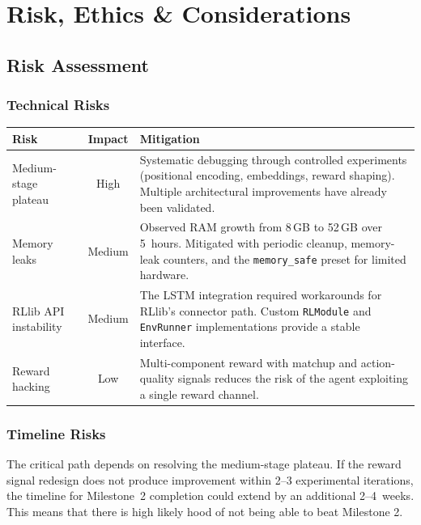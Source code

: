 \chapter{Risk, Ethics \& Considerations}
\label{ch:risk}

\section{Risk Assessment}

\subsection{Technical Risks}

\begin{center}
\small
\begin{tabularx}{\textwidth}{l c X}
  \toprule
  \textbf{Risk} & \textbf{Impact} & \textbf{Mitigation} \\
  \midrule
  Medium-stage plateau &
    High &
    Systematic debugging through controlled experiments (positional
    encoding, embeddings, reward shaping).  Multiple architectural
    improvements have already been validated. \\
  Memory leaks &
    Medium &
    Observed RAM growth from 8\,GB to 52\,GB over 5~hours.  Mitigated with
    periodic cleanup, memory-leak counters, and the \texttt{memory\_safe}
    preset for limited hardware. \\
  RLlib API instability &
    Medium &
    The LSTM integration required workarounds for RLlib's connector path.
    Custom \texttt{RLModule} and \texttt{EnvRunner} implementations provide
    a stable interface. \\
  Reward hacking &
    Low &
    Multi-component reward with matchup and action-quality signals reduces
    the risk of the agent exploiting a single reward channel. \\
  \bottomrule
\end{tabularx}
\end{center}

\subsection{Timeline Risks}

The critical path depends on resolving the medium-stage plateau.  If the
reward signal redesign does not produce improvement within 2--3 experimental
iterations, the timeline for Milestone~2 completion could extend by an
additional 2--4~weeks. This means that there is high likely hood of not being able to beat Milestone 2.

